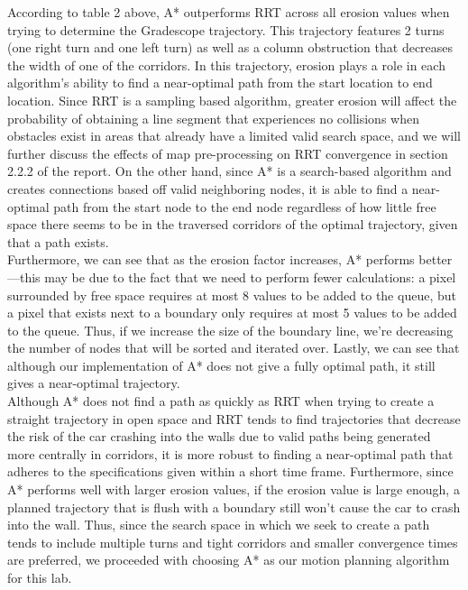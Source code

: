 \documentclass{article}
\begin{document}
According to table 2 above, A* outperforms RRT across all erosion values when trying to determine the Gradescope trajectory. This trajectory features 2 turns (one right turn and one left turn) as well as a column obstruction that decreases the width of one of the corridors. In this trajectory, erosion plays a role in each algorithm's ability to find a near-optimal path from the start location to end location. Since RRT is a sampling based algorithm, greater erosion will affect the probability of obtaining a line segment that experiences no collisions when obstacles exist in areas that already have a limited valid search space, and we will further discuss the effects of map pre-processing on RRT convergence in section 2.2.2 of the report. On the other hand, since A* is a search-based algorithm and creates connections based off valid neighboring nodes, it is able to find a near-optimal path from the start node to the end node regardless of how little free space there seems to be in the traversed corridors of the optimal trajectory, given that a path exists. \\

Furthermore, we can see that as the erosion factor increases, A* performs better—this may be due to the fact that we need to perform fewer calculations: a pixel surrounded by free space requires at most 8 values to be added to the queue, but a pixel that exists next to a boundary only requires at most 5 values to be added to the queue. Thus, if we increase the size of the boundary line, we're decreasing the number of nodes that will be sorted and iterated over. Lastly, we can see that although our implementation of A* does not give a fully optimal path, it still gives a near-optimal trajectory. \\

Although A* does not find a path as quickly as RRT when trying to create a straight trajectory in open space and RRT tends to find trajectories that decrease the risk of the car crashing into the walls due to valid paths being generated more centrally in corridors, it is more robust to finding a near-optimal path that adheres to the specifications given within a short time frame. Furthermore, since A* performs well with larger erosion values, if the erosion value is large enough, a planned trajectory that is flush with a boundary still won't cause the car to crash into the wall. Thus, since the search space in which we seek to create a path tends to include multiple turns and tight corridors and smaller convergence times are preferred, we proceeded with choosing A* as our motion planning algorithm for this lab. 
\end{document}
